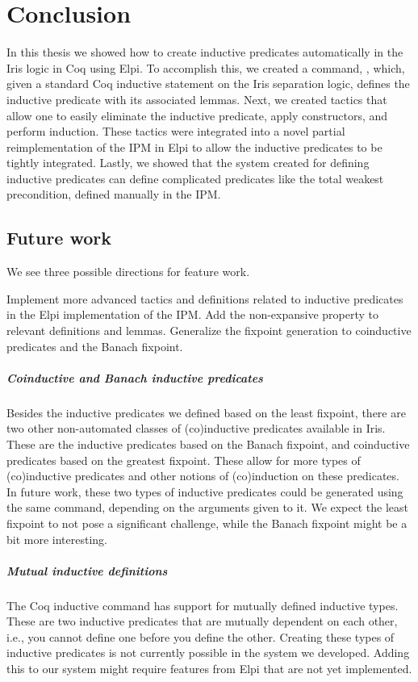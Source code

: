 \documentclass[thesis.tex]{subfiles}
\begin{document}
\VerbatimFootnotes

\chapter{Conclusion}\label{ch:conclusion}
In this thesis we showed how to create inductive predicates automatically in the Iris logic in Coq using Elpi. To accomplish this, we created a command, , which, given a standard Coq inductive statement on the Iris separation logic, defines the inductive predicate with its associated lemmas. Next, we created tactics that allow one to easily eliminate the inductive predicate, apply constructors, and perform induction. These tactics were integrated into a novel partial reimplementation of the IPM in Elpi to allow the inductive predicates to be tightly integrated. Lastly, we showed that the system created for defining inductive predicates can define complicated predicates like the total weakest precondition, defined manually in the IPM.

\section{Future work}
We see three possible directions for feature work.

Implement more advanced tactics and definitions related to inductive predicates in the Elpi implementation of the IPM. Add the non-expansive property to relevant definitions and lemmas. Generalize the fixpoint generation to coinductive predicates and the Banach fixpoint.

\paragraph{Coinductive and Banach inductive predicates}
Besides the inductive predicates we defined based on the least fixpoint, there are two other non-automated classes of (co)inductive predicates available in Iris. These are the inductive predicates based on the Banach fixpoint, and coinductive predicates based on the greatest fixpoint. These allow for more types of (co)inductive predicates and other notions of (co)induction on these predicates. In future work, these two types of inductive predicates could be generated using the same  command, depending on the arguments given to it. We expect the least fixpoint to not pose a significant challenge, while the Banach fixpoint might be a bit more interesting.

\paragraph{Mutual inductive definitions}
The Coq inductive command has support for mutually defined inductive types. These are two inductive predicates that are mutually dependent on each other, i.e., you cannot define one before you define the other. Creating these types of inductive predicates is not currently possible in the system we developed. Adding this to our system might require features from Elpi that are not yet implemented.
\end{document}
